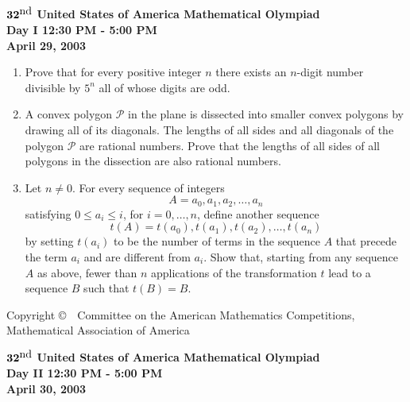\documentclass[12pt]{article}
\def\be{\begin{enumerate}}
\def\ee{\end{enumerate}}
\def\ii{\item}
\def\nd{^{\scriptstyle\mbox{nd}}}
\def\calP{\mathcal{P}}
\begin{document}
\begin{center}
${\bf 32\nd}$ {\bf United States of America Mathematical Olympiad} \\[.1in]
{\bf Day I \hspace{.25in} 12:30 PM - 5:00 PM}\\[.05in]
{\bf April 29, 2003}
\end{center}
\vspace*{.3in}

\be
\ii [1.] %
Prove that for every positive integer $n$ there exists an
$n$-digit number divisible by $5^n$ all of whose digits are odd.


\ii [2.]
A convex polygon $\calP$ in the plane is dissected into smaller
convex polygons by drawing all of its diagonals. The lengths of
all sides and all diagonals of the polygon $\calP$ are rational
numbers. Prove that the lengths of all sides of all polygons in
the dissection are also rational numbers.

\ii [3.]
Let $n \neq 0$. For every sequence of integers
\[
A = a_0,a_1,a_2,\dots, a_n
\]
satisfying $0 \le a_i \le i$, for $i=0,\dots,n$, define another
sequence
\[
t(A)= t(a_0), t(a_1), t(a_2), \dots, t(a_n)
\]
by setting $t(a_i)$ to be the number of terms in the sequence $A$
that precede the term $a_i$ and are different from $a_i$. Show
that, starting from any sequence $A$ as above, fewer than $n$
applications of the transformation $t$ lead to a sequence $B$ such
that $t(B) = B$.
\ee

\vspace{80mm}

{\small
\begin{center}
Copyright \copyright \ \ Committee on the American  Mathematics  Competitions,\\
Mathematical Association of America
\end{center}
}
\newpage

\begin{center}
${\bf 32\nd}$ {\bf United States of America Mathematical Olympiad} \\[.1in]
{\bf Day II \hspace{.25in} 12:30 PM - 5:00 PM}\\[.05in]
{\bf April 30, 2003}
\end{center}

\vfill
\end{document}
